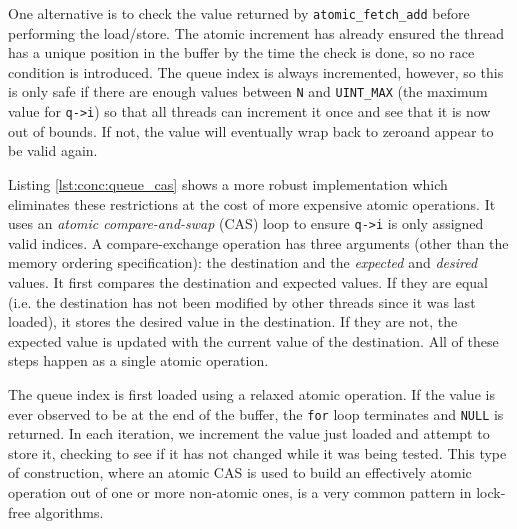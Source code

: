 One alternative is to check the value returned by \texttt{atomic\_fetch\_add}
before performing the load/store.  The atomic increment has already ensured the
thread has a unique position in the buffer by the time the check is done, so no
race condition is introduced.  The queue index is always incremented, however,
so this is only safe if there are enough values between \texttt{N} and
\texttt{UINT\_MAX} (the maximum value for \texttt{q->i}) so that all threads can
increment it once and see that it is now out of bounds.  If not, the value will
eventually wrap back to zero\footnotemark and appear to be valid again.


Listing \ref{lst:conc:queue_cas} shows a more robust implementation which
eliminates these restrictions at the cost of more expensive atomic operations.
It uses an \textit{atomic compare-and-swap} (CAS) loop to ensure \texttt{q->i}
is only assigned valid indices.  A compare-exchange operation has three
arguments (other than the memory ordering specification): the destination and
the \emph{expected} and \emph{desired} values.  It first compares the
destination and expected values.  If they are equal (i.e. the destination has
not been modified by other threads since it was last loaded), it stores the
desired value in the destination.  If they are not, the expected value is
updated with the current value of the destination.  All of these steps happen as
a single atomic operation.

\begin{figure}[ht]
    
\end{figure}

The queue index is first loaded using a relaxed atomic operation.  If the value
is ever observed to be at the end of the buffer, the \texttt{for} loop
terminates and \texttt{NULL} is returned.  In each iteration, we increment the
value just loaded and attempt to store it, checking to see if it has not changed
while it was being tested.  This type of construction, where an atomic CAS is
used to build an effectively atomic operation out of one or more non-atomic
ones, is a very common pattern in lock-free algorithms.

